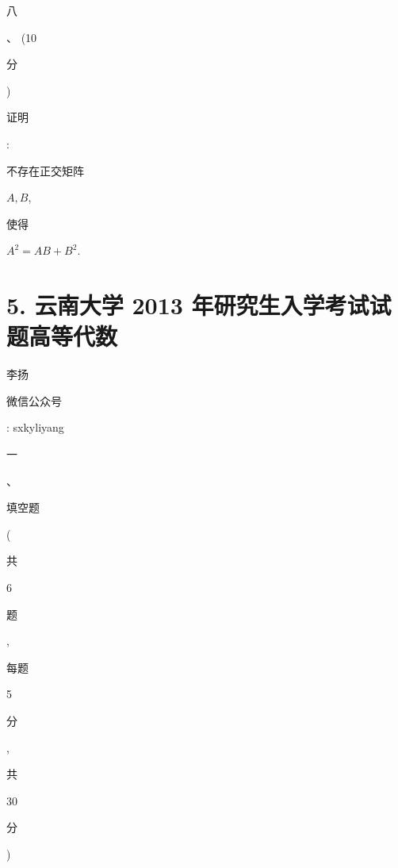 \documentclass[10pt]{article}
\begin{document}
\begin{CJK}{UTF8}{mj}八\end{CJK}、 (10 \begin{CJK}{UTF8}{mj}分\end{CJK}) \begin{CJK}{UTF8}{mj}证明\end{CJK}: \begin{CJK}{UTF8}{mj}不存在正交矩阵\end{CJK} $A, B$, \begin{CJK}{UTF8}{mj}使得\end{CJK} $A^{2}=A B+B^{2}$.

\section{5. 云南大学 2013 年研究生入学考试试题高等代数}
\begin{CJK}{UTF8}{mj}李扬\end{CJK}

\begin{CJK}{UTF8}{mj}微信公众号\end{CJK}: sxkyliyang

\begin{CJK}{UTF8}{mj}一\end{CJK}、\begin{CJK}{UTF8}{mj}填空题\end{CJK} (\begin{CJK}{UTF8}{mj}共\end{CJK} 6 \begin{CJK}{UTF8}{mj}题\end{CJK}, \begin{CJK}{UTF8}{mj}每题\end{CJK} 5 \begin{CJK}{UTF8}{mj}分\end{CJK}, \begin{CJK}{UTF8}{mj}共\end{CJK} 30 \begin{CJK}{UTF8}{mj}分\end{CJK})
\end{document}
